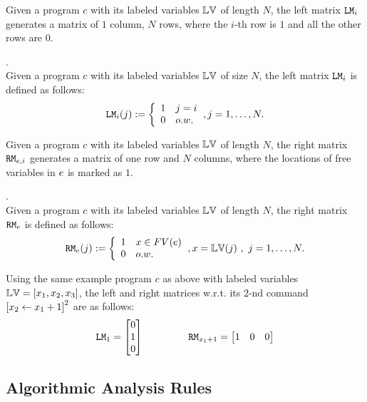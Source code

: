 Given a program  ${c}$ with its labeled variables $\mathbb{LV}$ of length $N$,
the left matrix $\mathtt{LM}_i$ generates a matrix of $1$ column, $N$ rows, 
where the $i$-th row is $1$ and all the other rows are $0$.
%
\begin{defn}.
\\
Given a program  ${c}$ with its labeled variables $\mathbb{LV}$ of size $N$, 
the left matrix $\mathtt{LM}_i$ is defined as follows:
\[
\lMtrix_i(j) : = 
\left
\{
\begin{array}{ll}
1 & j = i \\
0 & o.w.
\end{array}
\right.,
j = 1, \ldots, N.
\]
\end{defn}
%
Given a program  ${c}$ with its labeled variables $\mathbb{LV}$ of length $N$,
the right matrix $\mathtt{RM}_{e, i}$ generates a matrix of one row and $N$ columns, 
where the locations of free variables in $e$ is marked as $1$. 
%
%
\begin{defn}.
\\
Given a program  ${c}$ with its labeled variables $\mathbb{LV}$ of length $N$, 
the right matrix $\mathtt{RM}_{e}$ is defined as follows:
\[
\rMtrix_{\expr}(j) : = 
\left\{
\begin{array}{ll}
1 & {x} \in FV(\expr) 
\\
0 & o.w.
\end{array}
\right.,
{x} = \lvar(j) ~ , ~ j = 1, \ldots, N.
\]
%
%
\end{defn}
%
Using the same example program ${c}$ as above with labeled variables $\mathbb{LV} = [ {x_1 , x_2 , x_3} ] $,
the left and right matrices w.r.t. its $2$-nd command 
$\left[{\assign {x_2} {x_1 + 1}}\right]^2$  are as follows:
\[
\lMtrix_1 = \left[ \begin{matrix}
0   \\
1 	 \\
0   \\
\end{matrix}   \right ] 
~~~~~~~~~~~~~~
\rMtrix_{{x}_1 + 1}
= \left[ \begin{matrix} 
1 & 0 & 0 \\
\end{matrix}  \right]
\]
%
%
%
\subsection{Algorithmic Analysis Rules}
%
